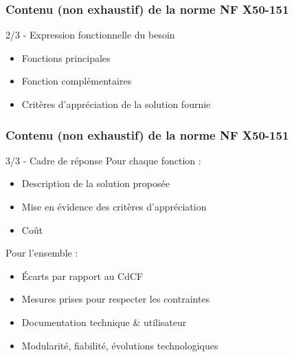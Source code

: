 \begin{frame}
\frametitle{Contenu (non exhaustif) de la norme NF X50-151}
\begin{exampleblock}{2/3 - Expression fonctionnelle du besoin}
\begin{itemize}
    \item Fonctions principales %
    \item Fonction complémentaires %
    \item Critères d'appréciation de la solution fournie %
\end{itemize}
\end{exampleblock}

\end{frame}

\begin{frame}
\frametitle{Contenu (non exhaustif) de la norme NF X50-151}

\begin{exampleblock}{3/3 - Cadre de réponse}
Pour chaque fonction :
\begin{itemize}
    \item Description de la solution proposée %
    \item Mise en évidence des critères d'appréciation %
    \item Coût %
\end{itemize}
Pour l'ensemble :
\begin{itemize}
    \item Écarts par rapport au CdCF %
    \item Mesures prises pour respecter les contraintes %
    \item Documentation technique \& utilisateur %
    \item Modularité, fiabilité, évolutions technologiques %
\end{itemize}
\end{exampleblock}

\end{frame} %

